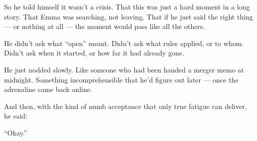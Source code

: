 So he told himself it wasn’t a crisis.
That this was just a hard moment in a long story.
That Emma was searching, not leaving.
That if he just said the right thing — or nothing at all — the moment would pass like all the others.

He didn’t ask what “open” meant.
Didn’t ask what rules applied, or to whom.
Didn’t ask when it started, or how far it had already gone.

He just nodded slowly.
Like someone who had been handed a merger memo at midnight.
Something incomprehensible that he’d figure out later — once the adrenaline came back online.

And then, with the kind of numb acceptance that only true fatigue can deliver,
he said:

“Okay.”

\medskip


